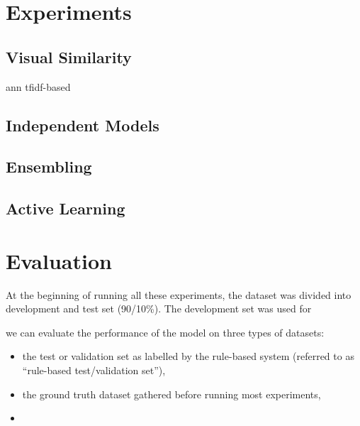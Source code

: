 \section{Experiments}

\subsection{Visual Similarity}
\label{exp_sim}

ann
tfidf-based

\subsection{Independent Models}
\label{exp_models}

\subsection{Ensembling}
\label{exp_ensembling}

\subsection{Active Learning}
\label{exp_al}


\section{Evaluation}
\label{evaluation}

At the beginning of running all these experiments, the dataset was divided into development and test set (90/10\%).
The development set was used for


 we can evaluate the performance of the model on three types of datasets:

\begin{itemize}
  \item the test or validation set as labelled by the rule-based system (referred to as ``rule-based test/validation set''),
  \item the ground truth dataset gathered  before running most experiments,
  \item
\end{itemize}
